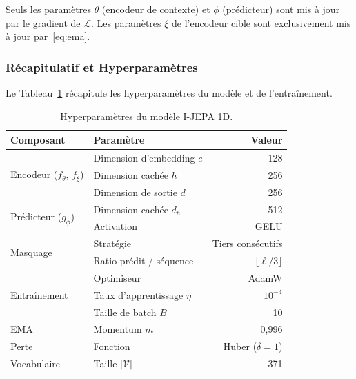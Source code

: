 Seuls les paramètres $\theta$ (encodeur de contexte) et $\phi$
(prédicteur) sont mis à jour par le gradient de $\mathcal{L}$.
Les paramètres $\xi$ de l'encodeur cible sont exclusivement mis à
jour par~\eqref{eq:ema}.
 
\subsubsection{Récapitulatif et Hyperparamètres}
\label{sub:hyperparams}
 
Le Tableau~\ref{tab:hyperparams} récapitule les hyperparamètres
du modèle et de l'entraînement.
 
\begin{table}[ht!]
\centering
\caption{Hyperparamètres du modèle I-JEPA 1D.}
\label{tab:hyperparams}
\renewcommand{\arraystretch}{1.25}
\begin{tabular}{llr}
\toprule
\textbf{Composant} & \textbf{Paramètre} & \textbf{Valeur} \\
\midrule
\multirow{3}{*}{Encodeur ($f_\theta$, $f_\xi$)}
  & Dimension d'embedding $e$      & 128 \\
  & Dimension cachée $h$           & 256 \\
  & Dimension de sortie $d$        & 256 \\[2pt]
\multirow{2}{*}{Prédicteur ($g_\phi$)}
  & Dimension cachée $d_h$         & 512 \\
  & Activation                     & GELU \\[2pt]
\multirow{2}{*}{Masquage}
  & Stratégie                      & Tiers consécutifs \\
  & Ratio prédit / séquence        & $\lfloor\ell/3\rfloor$ \\[2pt]
\multirow{3}{*}{Entraînement}
  & Optimiseur                     & AdamW \\
  & Taux d'apprentissage $\eta$    & $10^{-4}$ \\
  & Taille de batch $B$            & 10 \\[2pt]
EMA & Momentum $m$                 & 0{,}996 \\
Perte & Fonction                   & Huber ($\delta=1$) \\
Vocabulaire & Taille $|\mathcal{V}|$ & 371 \\
\bottomrule
\end{tabular}
\end{table}
